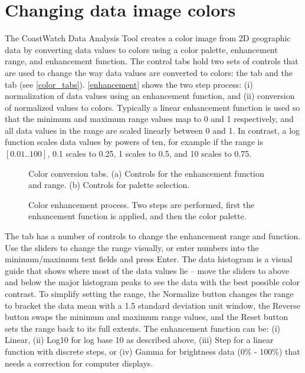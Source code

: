 \section{Changing data image colors}
\label{changing_colors}

The CoastWatch Data Analysis Tool creates a color image from 2D
geographic data by converting data values to colors using a color
palette, enhancement range, and enhancement function.  The
control tabs hold two sets of controls that are used to change
the way data values are converted to colors: the
 tab and the
 tab (see \autoref{color_tabs}).
\autoref{enhancement} shows the two step process: (i)
normalization of data values using an enhancement function, and
(ii) conversion of normalized values to colors.  Typically a
linear enhancement function is used so that the minimum and
maximum range values map to 0 and 1 respectively, and all data
values in the range are scaled linearly between 0 and 1.  In
contrast, a log function scales data values by powers of ten, for
example if the range is $[0.01..100]$, 0.1 scales to 0.25, 1
scales to 0.5, and 10 scales to 0.75.

\begin{figure}
  \begin{center}
    \caption[Color conversion tabs]{
       Color conversion tabs.  (a) Controls for the enhancement
       function and range.  (b) Controls for palette
       selection.
    }
    \label{color_tabs}
  \end{center}
\end{figure}

\begin{figure}
  \begin{center}
    \caption[Color enhancement process]{
       Color enhancement process.  Two steps are performed, first
       the enhancement function is applied, and then the color
       palette.
    }
    \label{enhancement}
  \end{center}
\end{figure}

The  tab has a number of
controls to change the enhancement range and function.  Use the
sliders to change the range visually, or enter numbers into the
minimum/maximum text fields and press Enter.  The data histogram
is a visual guide that shows where most of the data values lie --
move the sliders to above and below the major histogram peaks to
see the data with the best possible color contrast.  To simplify
setting the range, the {\gui Normalize} button changes the range
to bracket the data mean with a 1.5 standard deviation unit
window, the {\gui Reverse} button swaps the minimum and maximum
range values, and the {\gui Reset} button sets the range back to
its full extents.  The enhancement function can be: (i) {\gui Linear},
(ii) {\gui Log10} for log base 10 as described above, (iii) {\gui Step} 
for a linear function with discrete steps, or (iv) {\gui Gamma} for brightness
data (0\% - 100\%) that needs a correction for computer displays.

